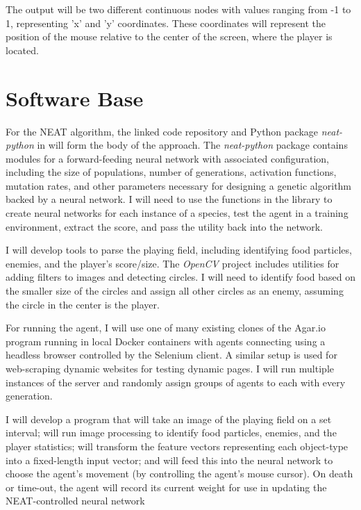 \documentclass[11pt]{article}
\begin{document}
The output will be two different continuous nodes with values ranging from -1 to 1, representing 'x' and 'y' coordinates. These coordinates will represent the position of the mouse relative to the center of the screen, where the player is located.

\section*{Software Base}

For the NEAT algorithm, the linked code repository and Python package \textit{neat-python} in \cite{stanley2002evolving} will form the body of the approach. The \textit{neat-python} package contains modules for a forward-feeding neural network with associated configuration, including the size of populations, number of generations, activation functions, mutation rates, and other parameters necessary for designing a genetic algorithm backed by a neural network. I will need to use the functions in the library to create neural networks for each instance of a species, test the agent in a training environment, extract the score, and pass the utility back into the network.

I will develop tools to parse the playing field, including identifying food particles, enemies, and the player's score/size. The \textit{OpenCV} project includes utilities for adding filters to images and detecting circles. I will need to identify food based on the smaller size of the circles and assign all other circles as an enemy, assuming the circle in the center is the player.

For running the agent, I will use one of many existing clones of the Agar.io program running in local Docker containers with agents connecting using a headless browser controlled by the Selenium client. A similar setup is used for web-scraping dynamic websites for testing dynamic pages. I will run multiple instances of the server and randomly assign groups of agents to each with every generation.

I will develop a program that will take an image of the playing field on a set interval; will run image processing to identify food particles, enemies, and the player statistics; will transform the feature vectors representing each object-type into a fixed-length input vector; and will feed this into the neural network to choose the agent's movement (by controlling the agent's mouse cursor). On death or time-out, the agent will record its current weight for use in updating the NEAT-controlled neural network
\end{document}

